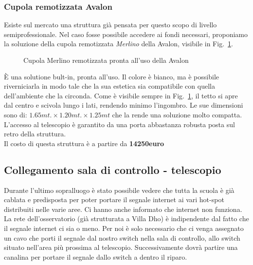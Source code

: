 \documentclass[a4paper,12pt]{article}
\begin{document}
\subsubsection{Cupola remotizzata Avalon}
Esiste sul mercato una struttura gi\`a pensata per questo scopo di livello semiprofessionale. Nel caso fosse possibile accedere ai fondi necessari, proponiamo la soluzione della cupola remotizzata \textit{Merlino} della Avalon, visibile in Fig.~\ref{MERLINO}.
\begin{figure}[H]
	\centering
	\caption{Cupola Merlino remotizzata pronta all'uso della Avalon}
	\label{MERLINO}
\end{figure}
\`E una solutione bult-in, pronta all'uso. Il colore \`e bianco, ma \`e possibile riverniciarla in modo tale che la sua estetica sia compatibile con quella dell'ambiente che la circonda. Come \`e visibile sempre in Fig.~\ref{MERLINO}, il tetto si apre dal centro e scivola lungo i lati, rendendo minimo l'ingombro. Le sue dimensioni sono di: $1.65 mt. \times 1.20 mt. \times 1.25 mt$ che la rende una soluzione molto compatta. L'accesso al telescopio \`e garantito da una porta abbastanza robusta posta sul retro della struttura.
\\
Il costo di questa struttura \`e a partire da \textbf{14250euro} 

\subsection{Collegamento sala di controllo - telescopio}
Durante l'ultimo sopralluogo \`e stato possibile vedere che tutta la scuola \`e gi\`a cablata e predisposta per poter portare il segnale internet ai vari hot-spot distribuiti nelle varie aree. Ci hanno anche informato che internet non funziona. La rete dell'osservatorio (gi\`a strutturata a Villa Dho) \`e indipendente dal fatto che il segnale  internet ci sia o meno. Per noi \`e solo necessario che ci venga assegnato un cavo che porti il segnale dal nostro switch nella sala di controllo, allo switch situato nell'area pi\`u prossima al telescopio. Successivamente dovr\`a partire una canalina per portare il segnale dallo switch a dentro il riparo.
\end{document}
